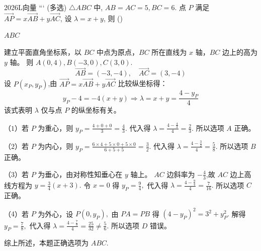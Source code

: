 \documentclass[12pt,UTF-8,a4paper]{ctexart}
\numberwithin{figure}{section}
\theoremstyle{mystyle}
\theoremstyle{mystylekaishu}
\theoremstyle{mystyle}
\numberwithin{xiti}{section}
\begin{document}

\begin{problem}{2026}{L}{}{}{向量}
```
(多选) $\triangle ABC$ 中, $AB=AC=5, BC=6$. 点 $P$ 满足 $\overrightarrow{AP}=x \overrightarrow{AB}+y \overrightarrow{AC}$, 设 $\lambda=x+y$, 则 (\hspace{1cm})
\begin{choices}
\end{choices}
\end{problem}

\begin{answer}
$ABC$
\end{answer}

\begin{solutions}
建立平面直角坐标系，以 $BC$ 中点为原点，$BC$ 所在直线为 $x$ 轴，$BC$ 边上的高为 $y$ 轴。
则 $A(0,4), B(-3,0), C(3,0)$.
$$
\overrightarrow{AB}=(-3,-4), \quad \overrightarrow{AC}=(3,-4)
$$
设 $P(x_P,y_P)$,由 $\overrightarrow{AP}=x \overrightarrow{AB}+y \overrightarrow{AC}$ 比较纵坐标得：
$$
y_P-4=-4(x+y) \Rightarrow \lambda=x+y=\frac{4-y_P}{4}
$$
该式表明 $\lambda$ 仅与点 $P$ 的纵坐标有关。

（$1$）若 $P$ 为重心，则 $y_P=\displaystyle\frac{4+0+0}{3}=\displaystyle\frac{4}{3}.$
代入得 $\lambda=\displaystyle\frac{4-\frac{4}{3}}{4}=\displaystyle\frac{2}{3}.$ 所以选项 $A$ 正确。

（$2$）若 $P$ 为内心，则 $y_P=\displaystyle\frac{6\times 4+5\times 0+5\times 0}{6+5+5}=\displaystyle\frac{3}{2}.$
代入得 $\lambda=\displaystyle\frac{4-\frac{3}{2}}{4}=\displaystyle\frac{5}{8}.$ 所以选项 $B$ 正确。

（$3$）若 $P$ 为垂心，由对称性知垂心在 $y$ 轴上。
$AC$ 边斜率为 $-\displaystyle\frac{4}{3}$,故 $AC$ 边上高线方程为 $y=\displaystyle\frac{3}{4}(x+3).$
令 $x=0$ 得 $y_P=\displaystyle\frac{9}{4},$ 代入得 $\lambda=\displaystyle\frac{4-\frac{9}{4}}{4}=\displaystyle\frac{7}{16}.$ 所以选项 $C$ 正确。

（$4$）若 $P$ 为外心，设 $P(0,y_P),$ 由 $PA=PB$ 得 $(4-y_P)^2=3^2+y_P^2.$
解得 $y_P=\displaystyle\frac{7}{8},$ 代入得 $\lambda=\displaystyle\frac{4-\frac{7}{8}}{4}=\displaystyle\frac{25}{32}\neq\displaystyle\frac{5}{6}.$ 所以选项 $D$ 错误。

综上所述，本题正确选项为 $ABC.$ 
\end{solutions}
\end{document}
